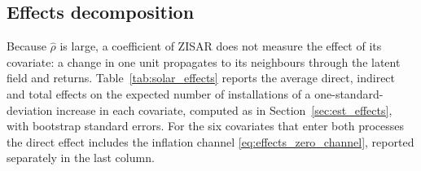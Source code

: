 \subsection{Effects decomposition}\label{sec:solar_effects}

Because $\hat\rho$ is large, a coefficient of ZISAR does not measure the effect of its covariate: a change in one unit propagates to its neighbours through the latent field and returns.
Table~\ref{tab:solar_effects} reports the average direct, indirect and total effects on the expected number of installations of a one-standard-deviation increase in each covariate, computed as in Section~\ref{sec:est_effects}, with bootstrap standard errors.
For the six covariates that enter both processes the direct effect includes the inflation channel \eqref{eq:effects_zero_channel}, reported separately in the last column.

